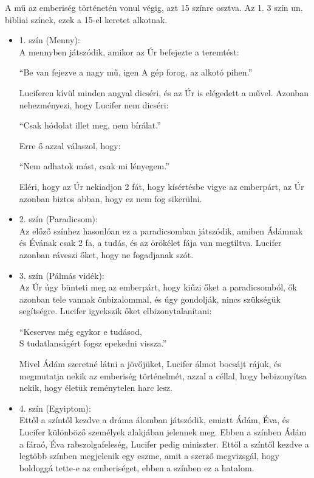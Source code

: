 \documentclass[]{article}
\begin{document}
	A mű az emberiség történetén vonul végig, azt 15 színre osztva. Az 1. 3 szín un. bibliai színek, ezek a 15-el keretet alkotnak.
	\begin{itemize}
		\item 1. szín (Menny):\\
			A mennyben játszódik, amikor az Úr befejezte a teremtést:
			\begin{displayquote}
				\enquote{Be van fejezve a nagy mű, igen A gép forog, az alkotó pihen.}
			\end{displayquote}
			Luciferen kívül minden angyal dicséri, és az Úr is elégedett a művel. Azonban nehezményezi, hogy Lucifer nem dicséri:
			\begin{displayquote}
				\enquote{Csak hódolat illet meg, nem bírálat.}
			\end{displayquote}
			Erre ő azzal válaszol, hogy:
			\begin{displayquote}
				\enquote{Nem adhatok mást, csak mi lényegem.}
			\end{displayquote}
			Eléri, hogy az Úr nekiadjon 2 fát, hogy kísértésbe vigye az emberpárt, az Úr azonban biztos abban, hogy ez nem fog sikerülni.
		\item 2. szín (Paradicsom):\\
			Az előző színhez hasonlóan ez a paradicsomban játszódik, amiben Ádámnak és Évának csak 2 fa, a tudás, és az örökélet fája van megtiltva. Lucifer azonban ráveszi őket, hogy ne fogadjanak szót.
		\item 3. szín (Pálmás vidék):\\
			Az Úr úgy bünteti meg az emberpárt, hogy kiűzi őket a paradicsomból, ők azonban tele vannak önbizalommal, és úgy gondolják, nincs szükségük segítségre. Lucifer igyekszik őket elbizonytalanítani:
			\begin{displayquote}
				\enquote{Keserves még egykor e tudásod, \\
			S tudatlanságért fogsz epekedni vissza.}
			\end{displayquote}
			Mivel Ádám szeretné látni a jövőjüket, Lucifer álmot bocsájt rájuk, és megmutatja nekik az emberiség történelmét, azzal a céllal, hogy bebizonyítsa nekik, hogy életük reménytelen harc lesz.
		\item 4. szín (Egyiptom):\\
			Ettől a színtől kezdve a dráma álomban játszódik, emiatt Ádám, Éva, és Lucifer különböző személyek alakjában jelennek meg. Ebben a színben Ádám a fáraó, Éva rabszolgafeleség, Lucifer pedig miniszter. Ettől a színtől kezdve a legtöbb színben megjelenik egy eszme, amit a szerző megvizsgál, hogy boldoggá tette-e az emberiséget, ebben a színben ez a hatalom.
			

\end{itemize}
\end{document}
